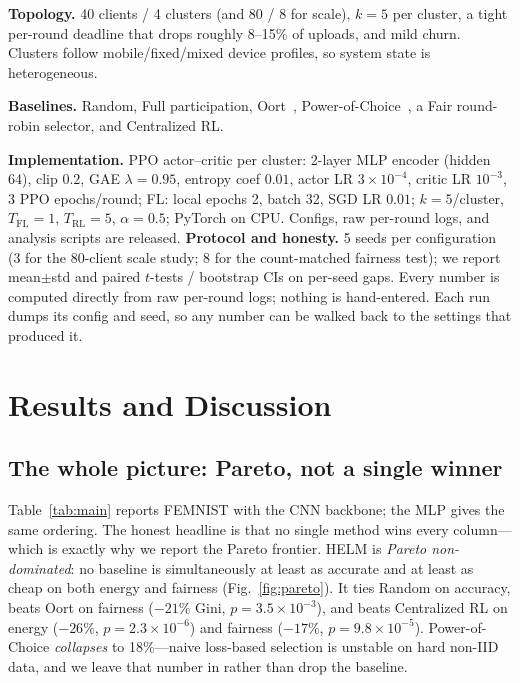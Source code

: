 \documentclass[conference]{IEEEtran}
\begin{document}
\textbf{Topology.} 40 clients / 4 clusters (and 80 / 8 for scale), $k{=}5$ per
cluster, a tight per-round deadline that drops roughly 8--15\% of uploads, and
mild churn. Clusters follow mobile/fixed/mixed device profiles, so system state
is heterogeneous.

\textbf{Baselines.} Random, Full participation, Oort~\cite{oort},
Power-of-Choice~\cite{poc}, a Fair round-robin selector, and Centralized RL.

\textbf{Implementation.} PPO actor--critic per cluster: 2-layer MLP encoder (hidden 64), clip $0.2$, GAE $\lambda{=}0.95$, entropy coef $0.01$, actor LR $3{\times}10^{-4}$, critic LR $10^{-3}$, 3 PPO epochs/round; FL: local epochs 2, batch 32, SGD LR $0.01$; $k{=}5$/cluster, $T_{\text{FL}}{=}1$, $T_{\text{RL}}{=}5$, $\alpha{=}0.5$; PyTorch on CPU. Configs, raw per-round logs, and analysis scripts are released. \textbf{Protocol and honesty.} 5 seeds per configuration (3 for the 80-client scale study; 8 for the count-matched fairness test); we report mean$\pm$std and paired
$t$-tests / bootstrap CIs on per-seed gaps. Every number is computed directly from
raw per-round logs; nothing is hand-entered. Each run dumps its config and seed,
so any number can be walked back to the settings that produced it.

\section{Results and Discussion}
\subsection{The whole picture: Pareto, not a single winner}
Table~\ref{tab:main} reports FEMNIST with the CNN backbone; the MLP gives the same
ordering. The honest headline is that no single method wins every column---which
is exactly why we report the Pareto frontier. HELM is \emph{Pareto
non-dominated}: no baseline is simultaneously at least as accurate and at least as
cheap on both energy and fairness (Fig.~\ref{fig:pareto}). It ties Random on
accuracy, beats Oort on fairness ($-21\%$ Gini,
$p{=}3.5{\times}10^{-3}$), and beats Centralized RL on energy ($-26\%$,
$p{=}2.3{\times}10^{-6}$) and fairness ($-17\%$, $p{=}9.8{\times}10^{-5}$).
Power-of-Choice \emph{collapses} to 18\%---naive loss-based selection is unstable
on hard non-IID data, and we leave that number in rather than drop the baseline.
\end{document}

